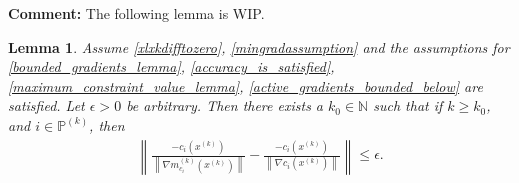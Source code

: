 \documentclass{article}
\newenvironment{comment}
  {\par\medskip
   \color{red}%
   \begin{framed}
   \textbf{Comment: }\ignorespaces}
 {\end{framed}
  \medskip}
\newtheorem{lemma}[theorem]{Lemma}
\theoremstyle{case}
\numberwithin{theorem}{subsection}
\newcommand{\gmcik}{{\nabla m_{c_i}^{(k)}\left(\xk\right)}}
\newcommand{\naturals}{\mathbb N}
\newcommand{\xk}{{x^{(k)}}}
\newcommand{\activeprojk}{{\mathbb P^{(k)}}}
\begin{document}
\begin{comment}
The following lemma is WIP.
\end{comment}

\begin{lemma}
\label{ziks_are_close_lemma}
Assume \cref{xlxkdifftozero},
\cref{mingradassumption} and the assumptions for
\cref{bounded_gradients_lemma},
\cref{accuracy_is_satisfied},
\cref{maximum_constraint_value_lemma},
\cref{active_gradients_bounded_below}
are satisfied.
Let $\epsilon > 0$ be arbitrary.
Then there exists a $k_0 \in \naturals$ such that if $k \ge k_0$, and $i \in \activeprojk$,
then 
\begin{align*}
\left\|\frac{-c_i\left(\xk \right)}{\left\|\gmcik\right\|} - \frac{-c_i\left(\xk \right)}{\left\|\nabla c_i\left(\xk \right)\right\|} \right\| \le \epsilon.
\end{align*}
\end{lemma}
\end{document}
